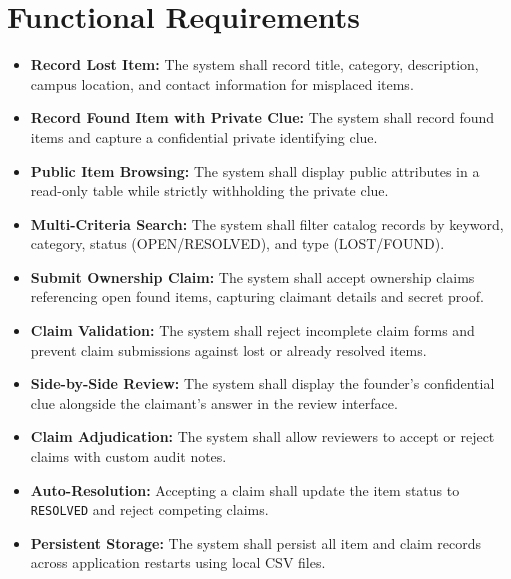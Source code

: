 \documentclass[11pt,a4paper]{article}
\begin{document}
\section{Functional Requirements}
\begin{itemize}[label=\textbf{FR\arabic*.}]
    \item \textbf{Record Lost Item:} The system shall record title, category, description, campus location, and contact information for misplaced items.
    \item \textbf{Record Found Item with Private Clue:} The system shall record found items and capture a confidential private identifying clue.
    \item \textbf{Public Item Browsing:} The system shall display public attributes in a read-only table while strictly withholding the private clue.
    \item \textbf{Multi-Criteria Search:} The system shall filter catalog records by keyword, category, status (OPEN/RESOLVED), and type (LOST/FOUND).
    \item \textbf{Submit Ownership Claim:} The system shall accept ownership claims referencing open found items, capturing claimant details and secret proof.
    \item \textbf{Claim Validation:} The system shall reject incomplete claim forms and prevent claim submissions against lost or already resolved items.
    \item \textbf{Side-by-Side Review:} The system shall display the founder's confidential clue alongside the claimant's answer in the review interface.
    \item \textbf{Claim Adjudication:} The system shall allow reviewers to accept or reject claims with custom audit notes.
    \item \textbf{Auto-Resolution:} Accepting a claim shall update the item status to \texttt{RESOLVED} and reject competing claims.
    \item \textbf{Persistent Storage:} The system shall persist all item and claim records across application restarts using local CSV files.
\end{itemize}

\end{document}
